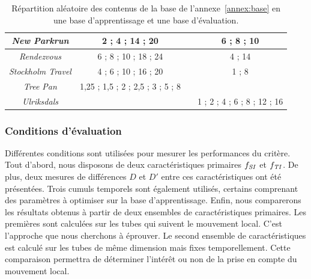 \begin{table}[htbp]
\begin{tabular}{>{\itshape}ccp{.5cm}c}
New Parkrun							& 2 ; 4 ; 14 ; 20 									& & 6 ; 8 ; 10							\\ \midrule
Rendezvous							& 6 ; 8 ; 10 ; 18 ; 24 							& & 4 ; 14								\\ \midrule
Stockholm Travel					& 4 ; 6 ; 10 ; 16 ; 20 							& & 1 ; 8									\\ \midrule
Tree Pan								& 1,25 ; 1,5 ; 2 ; 2,5 ; 3 ; 5 ; 8 																\\ \midrule
Ulriksdals								& 										 					& & 1 ; 2 ; 4 ; 6 ; 8 ; 12 ; 16		\\ \bottomrule
\end{tabular}
\caption{Répartition aléatoire des contenus de la base de l'annexe~\ref{annex:base} en une base d'apprentissage et une base d'évaluation.}
\label{tab:bases2}
\end{table}


\subsubsection{Conditions d'évaluation}
Différentes conditions sont utilisées pour mesurer les performances du critère. Tout d'abord, nous disposons de deux caractéristiques primaires $f_{\mathit{SI}}$ et $f_{\mathit{TI}}$. De plus, deux mesures de différences $D$ et $D'$ entre ces caractéristiques ont été présentées. Trois cumuls temporels sont également utilisés, certains comprenant des paramètres à optimiser sur la base d'apprentissage. Enfin, nous comparerons les résultats obtenus à partir de deux ensembles de caractéristiques primaires. Les premières sont calculées sur les tubes qui suivent le mouvement local. C'est l'approche que nous cherchons à éprouver. Le second ensemble de caractéristiques est calculé sur les tubes de même dimension mais fixes temporellement. Cette comparaison permettra de déterminer l'intérêt ou non de la prise en compte du mouvement local.


